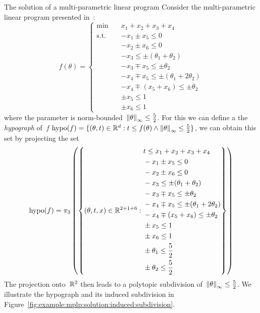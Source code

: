 \begin{example}{The solution of a multi-parametric linear program}\label{example:mplp:induced:complex}
Consider the multi-parametric linear program presented in~\cite{Borrelli:2003}:
%
\begin{equation}
	f(\theta)=\left\{\begin{aligned}
	\min\quad & x_1+x_2+x_3+x_4\\
	\text{s.t.}\quad & -x_1\pm x_5\leq0\\
	& -x_2\pm x_6\leq 0\\
	& -x_3\leq \pm(\theta_1+\theta_2)\\
	& -x_3\mp x_5\leq \pm\theta_2\\
	& -x_4\mp x_5\leq \pm(\theta_1+2\theta_2)\\
	& -x_4\mp(x_5+x_6) \leq\pm\theta_2\\
	& \pm x_5\leq 1\\
	& \pm x_6\leq 1
	\end{aligned}\right.
\end{equation}
%
where the parameter is norm-bounded~$\left\|\theta\right\|_\infty\leq\frac{5}{2}$.
%
For this we can define a the \emph{hypograph} of~$f$ $\text{hypo}(f) = \{(\theta,t)\in\mathbb R^d:t\leq f(\theta)\wedge\left\|\theta\right\|_\infty\leq\frac{5}{2}\}$, we can obtain this set by projecting the set
%
\begin{equation}
	\text{hypo}(f)=\pi_3\left(\left\{(\theta,t,x)\in\mathbb R^{2+1+6}:\begin{aligned}
	 &t\leq x_1+x_2+x_3+x_4\\
	 & -x_1\pm x_5\leq0\\
	& -x_2\pm x_6\leq 0\\
	& -x_3\leq \pm(\theta_1+\theta_2)\\
	& -x_3\mp x_5\leq \pm\theta_2\\
	& -x_4\mp x_5\leq \pm(\theta_1+2\theta_2)\\
	& -x_4\mp(x_5+x_6) \leq\pm\theta_2\\
	& \pm x_5\leq 1\\
	& \pm x_6\leq 1\\
	& \pm \theta_1\leq\frac{5}{2}\\
	& \pm\theta_2\leq\frac{5}{2}
	\end{aligned}\right\}\right)
\end{equation}
%
The projection onto~$\mathbb R^2$ then leads to a polytopic subdivision of~$\left\|\theta\right\|_\infty\leq\frac{5}{2}$.
%
We illustrate the hypograph and its induced subdivision in Figure~\ref{fig:example:mplp:solution:induced:subdivision}.
%
\begin{figure}\centering
{}
\end{figure}
\end{example}
